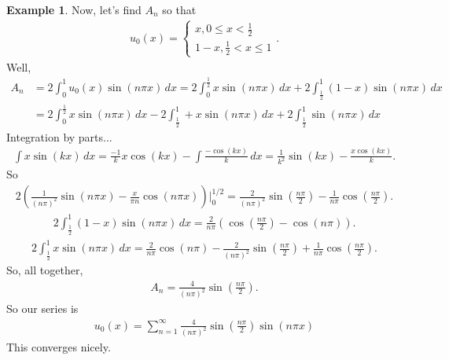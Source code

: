 \documentclass{book}
\theoremstyle{definition}
\newtheorem{exmp}{Example}[section]
\begin{document}
\begin{exmp}
	Now, let's find $A_n$ so that 
	\begin{align*}
	u_0(x) = \begin{cases}
	x, 0\leq x < \frac{1}{2}\\
	1-x, \frac{1}{2} < x \leq 1
	\end{cases}.
	\end{align*}
	Well,
	\begin{align*}
	A_n &= 2\int_{0}^1 u_0(x)\sin(n\pi x)\,dx = 2\int_{0}^\frac{1}{2} x\sin(n\pi x)\,dx + 2\int_{\frac{1}{2}}^1 (1-x)\sin(n\pi x)\,dx\\
	&= 2\int_{0}^\frac{1}{2} x\sin(n\pi x)\,dx - 2\int_\frac{1}{2}^1 +  x\sin(n\pi x)\,dx + 2\int_{\frac{1}{2}}^1 \sin(n\pi x)\,dx
	\end{align*}
	Integration by parts...
	\begin{align*}
	\int x\sin(kx)\,dx = \frac{-1}{k}x\cos(kx) - \int \frac{-\cos(kx)}{k}\,dx = \frac{1}{k^2}\sin(kx) - \frac{x\cos(kx)}{k}.
	\end{align*}
	So
	\begin{align*}
	2\left( \frac{1}{(n\pi)^2}\sin(n\pi x) - \frac{x}{\pi n}\cos(n\pi x)
	 \right)\bigg\vert^{1/2}_0
	 = \frac{2}{(n\pi)^2}\sin\left( \frac{n\pi}{2}\right)  - \frac{1}{n\pi}\cos\left( \frac{n\pi}{2}\right).
	\end{align*}
	\begin{align*}
	2\int_{\frac{1}{2}}^1 (1-x)\sin(n\pi x)\,dx = 
	\frac{2}{n\pi}\left( \cos\left(\frac{n\pi}{2} \right)  - \cos(n\pi)\right).
	\end{align*}
	\begin{align*}
	2\int_\frac{1}{2}^1 x\sin(n\pi x)\,dx = \frac{2}{n\pi}\cos(n\pi) - \frac{2}{(n\pi)^2}\sin\left( \frac{n\pi}{2} \right) + \frac{1}{n\pi}\cos\left(\frac{n\pi}{2} \right).
	\end{align*}
	So, all together,
	\begin{align*}
	A_n = \frac{4}{(n\pi)^2}\sin\left( \frac{n\pi}{2}\right).
	\end{align*}
	So our series is
	\begin{align*}
	u_0(x) = \sum_{n=1}^\infty \frac{4}{(n\pi)^2}\sin\left( \frac{n\pi}{2}\right) \sin(n\pi x)
	\end{align*}
	This converges nicely. 
\end{exmp}
\end{document}
